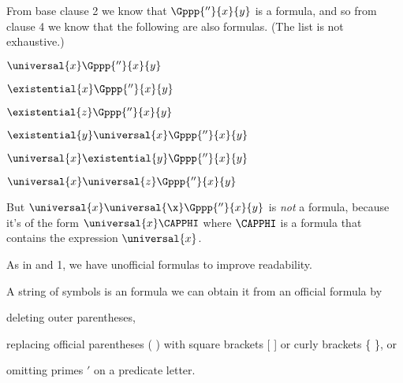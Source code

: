 From base clause 2 we know that $\Gppp{''}{\variable{x}}{\variable{y}}$ is a formula, and so from clause 4 we know that the following are also formulas. 
(The list is not exhaustive.) 
\begin{multicols}{2}
\begin{menumerate}
\item $\universal{\variable{x}}\Gppp{''}{\variable{x}}{\variable{y}}$ 
\item $\existential{\variable{x}}\Gppp{''}{\variable{x}}{\variable{y}}$ 
\item $\existential{\variable{z}}\Gppp{''}{\variable{x}}{\variable{y}}$
\item $\existential{\variable{y}}\universal{\variable{x}}\Gppp{''}{\variable{x}}{\variable{y}}$ 
\item $\universal{\variable{x}}\existential{\variable{y}}\Gppp{''}{\variable{x}}{\variable{y}}$ 
\item $\universal{\variable{x}}\universal{\variable{z}}\Gppp{''}{\variable{x}}{\variable{y}}$ 
\end{menumerate}
\end{multicols}
\noindent{}But $\universal{\variable{x}}\universal{\x}\Gppp{''}{\variable{x}}{\variable{y}}$ is \emph{not} a formula, because it's of the form $\universal{\variable{x}}\CAPPHI$ where $\CAPPHI$ is a formula that contains the expression $\universal{\variable{x}}$.

As in \GSL{} and \GQL{}1, we have unofficial formulas to improve readability.
\begin{majorILnc}{}
A string of symbols is an  formula \Iff we can obtain it from an official formula by
\begin{cenumerate}
\item deleting outer parentheses,
\item replacing official parentheses ( ) with square brackets [ ] or curly brackets \{ \}, or
\item omitting primes $'$ on a predicate letter.
\end{cenumerate}
\end{majorILnc}

